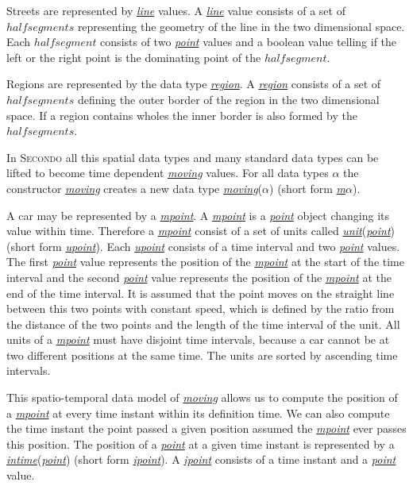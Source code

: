 \documentclass[a4paper]{article}
\newcommand{\secondo}{\textsc{Secondo}}
\newcommand{\dt}[1]{\textsl{\underline{#1}}}
\begin{document}
Streets are represented by \dt{line} values. A \dt{line} value consists of a set
of $half segments$ representing the geometry of the line in the two dimensional space.
Each $half segment$ consists of two \dt{point} values and a boolean value telling
if the left or the right point is the dominating point of the $half segment$.

Regions are represented by the data type \dt{region}. A \dt{region} consists of
a set of $half segments$ defining the outer border of the region in
the two dimensional space. If a region contains wholes the inner border is also
formed by the $half segments$.

In \secondo{} all this spatial data types and many standard data types can be
lifted to become time dependent \dt{moving} values. For all data types \dt{$\alpha$}
the constructor \dt{moving} creates a new data type \dt{moving}(\dt{$\alpha$})
(short form \dt{m$\alpha$}).

A car may be represented by a \dt{mpoint}. A \dt{mpoint} is a \dt{point} object changing
its value within time. Therefore a \dt{mpoint} consist of a set of units called
\dt{unit}(\dt{point}) (short form \dt{upoint}). Each \dt{upoint} consists of a time
interval and two \dt{point} values. The first \dt{point} value represents the
position of the \dt{mpoint} at the start of the time interval and the second
\dt{point} value represents the position of the \dt{mpoint} at the end of the
time interval. It is assumed that the point moves on the straight line between
this two points with constant speed, which is defined by the ratio from the
distance of the two points and the length of the time interval of the unit.
All units of a \dt{mpoint} must have disjoint time intervals, because a car
cannot be at two different positions at the same time.
The units are sorted by ascending time intervals.

This spatio-temporal data model of \dt{moving} allows us to compute the position
of a \dt{mpoint} at every time instant within its definition time.
We can also compute the time instant the point passed a
given position assumed the \dt{mpoint} ever passes this position. The position of a
\dt{point} at a given time instant is represented by a \dt{intime}(\dt{point})
(short form \dt{ipoint}). A \dt{ipoint} consists of a time instant and a \dt{point} value.
\end{document}
